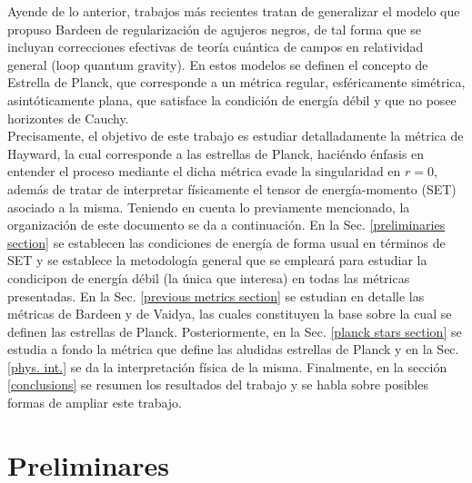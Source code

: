 \documentclass[16pt,a4paper]{article}
\numberwithin{equation}{section}
\theoremstyle{definition}
\begin{document}
Ayende de lo anterior, trabajos más recientes \cite{hayward2006,lorenzo,rovelli} tratan de generalizar el modelo que propuso Bardeen de regularización de agujeros negros, de tal forma que se incluyan correcciones efectivas de teoría cuántica de campos en relatividad general (loop quantum gravity). En estos modelos se definen el concepto de Estrella de Planck, que corresponde a un métrica regular, esféricamente simétrica, asintóticamente plana, que satisface la condición de energía débil y que no posee horizontes de Cauchy.\\

Precisamente, el objetivo de este trabajo es estudiar detalladamente la métrica de Hayward, la cual corresponde a las estrellas de Planck, haciéndo énfasis en entender el proceso mediante el dicha métrica evade la singularidad en $r = 0$, además de tratar de interpretar físicamente el tensor de energía-momento (SET) asociado a la misma. Teniendo en cuenta lo previamente mencionado, la organización de este documento se da a continuación. En la Sec. \ref{preliminaries section} se establecen las condiciones de energía de forma usual en términos de SET y se establece la metodología general que se empleará para estudiar la condicipon de energía débil (la única que interesa) en todas las métricas presentadas. En la Sec. \ref{previous metrics section} se estudian en detalle las métricas de Bardeen y de Vaidya, las cuales constituyen la base sobre la cual se definen las estrellas de Planck. Posteriormente, en la Sec. \ref{planck stars section} se estudia a fondo la métrica que define las aludidas estrellas de Planck y en la Sec. \ref{phys. int.} se da la interpretación física de la misma. Finalmente, en la sección \ref{conclusions} se resumen los resultados del trabajo y se habla sobre posibles formas de ampliar este trabajo.\\


\newpage
\section{\label{preliminaries section} Preliminares}
\end{document}
